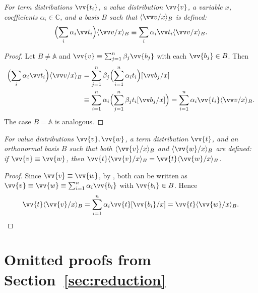 \documentclass[runningheads,orivec,envcountsame,envcountsect]{llncs}
\newcommand\ansubst[2]{\ensuremath{\langle #1 \rangle_{#2}}}
\newcommand\AbsBasis{\ensuremath{\mathbb{A}}}
\def\C{\mathbb{C}}            %
\begin{document}
\begin{restatelemma}
  \itshape
  For term distributions $\vv{t_i}$, a value distribution $\vv{v}$, a
  variable $x$, coefficients $\alpha_i\in\C$, and a basis $B$ such that
  $\ansubst{\vv v/x}{B}$ is defined:
  \[
    \Bigl(\sum_i \alpha_i\vv t_i\Bigr)\ansubst{\vv v/x}{B}
    \equiv
    \sum_i \alpha_i\vv t_i \ansubst{\vv v/x}{B}.
  \]
\end{restatelemma}
\begin{proof}
  Let $B\neq\AbsBasis$ and
  $\vv{v}\equiv\sum_{j=1}^n\beta_j\vv{b_j}$ with each $\vv{b_j}\in B$.
  Then
  \begin{align*}
    \Bigl(\sum_i \alpha_i\vv t_i\Bigr)\ansubst{\vv v/x}{B}
    &= \sum_{j=1}^n \beta_j\Bigl(\sum_{i=1}^{n}\alpha_i t_i\Bigr)[\vv b_j/x]\\
    &\equiv \sum_{i=1}^{n}\alpha_i\Bigl(\sum_{j=1}^n\beta_j t_i[\vv b_j/x]\Bigr)
    = \sum_{i=1}^{n}\alpha_i\vv{t_i}\ansubst{\vv v/x}{B}.
  \end{align*}
  The case $B=\AbsBasis$ is analogous.
\end{proof}

\begin{restatelemma}
  \itshape
  For value distributions $\vv{v},\vv{w}$, a term distribution $\vv{t}$, and
  an orthonormal basis $B$ such that both
  $\ansubst{\vv{v}/x}{B}$ and $\ansubst{\vv{w}/x}{B}$ are defined:
  if $\vv{v}\equiv\vv{w}$, then
  $\vv{t}\ansubst{\vv{v}/x}{B}
  =\vv{t}\ansubst{\vv{w}/x}{B}$.
\end{restatelemma}
\begin{proof}
  Since $\vv{v}\equiv\vv{w}$, by
  ,
  both can be written as
  $\vv{v}\equiv\vv{w}\equiv\sum_{i=1}^{n}\alpha_i\vv{b_i}$ with
  $\vv{b_i}\in B$. Hence
  \[
    \vv{t}\ansubst{\vv{v}/x}{B}
    = \sum_{i=1}^{n}\alpha_i\vv{t}[\vv{b_i}/x]
    = \vv{t}\ansubst{\vv{w}/x}{B}.
  \]
\end{proof}

\section{Omitted proofs from Section~\ref{sec:reduction}}\label{sec:appendixB}
\end{document}
